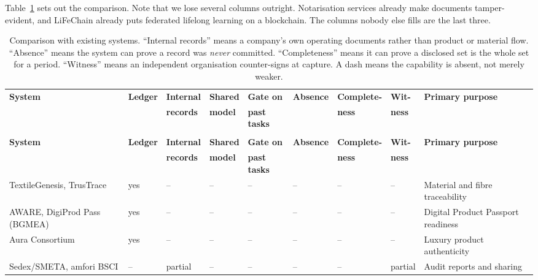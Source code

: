 \documentclass[11pt,a4paper]{article}
\begin{document}
Table~\ref{tab:market} sets out the comparison. Note that we lose several
columns outright. Notarisation services already make documents tamper-evident,
and LiFeChain already puts federated lifelong learning on a blockchain. The
columns nobody else fills are the last three.

\begingroup
\scriptsize
\setlength{\tabcolsep}{2.5pt}
\begin{longtable}{@{}>{\raggedright\arraybackslash}p{2.8cm}
  >{\centering\arraybackslash}p{1.1cm}
  >{\centering\arraybackslash}p{1.25cm}
  >{\centering\arraybackslash}p{1.1cm}
  >{\centering\arraybackslash}p{1.1cm}
  >{\centering\arraybackslash}p{1.25cm}
  >{\centering\arraybackslash}p{1.6cm}
  >{\centering\arraybackslash}p{1.0cm}
  >{\raggedright\arraybackslash}p{3.3cm}@{}}
\caption{Comparison with existing systems. ``Internal records'' means a
company's own operating documents rather than product or material flow.
``Absence'' means the system can prove a record was \emph{never} committed.
``Completeness'' means it can prove a disclosed set is the whole set for a period.
``Witness'' means an independent organisation counter-signs at capture. A dash
means the capability is absent, not merely weaker.}
\label{tab:market}\\
\toprule
\textbf{System} & \textbf{Ledger} & \textbf{Internal} & \textbf{Shared} &
\textbf{Gate on} & \textbf{Absence} & \textbf{Complete-} & \textbf{Wit-} &
\textbf{Primary purpose} \\
 & & \textbf{records} & \textbf{model} & \textbf{past tasks} & & \textbf{ness} & \textbf{ness} & \\
\midrule
\endfirsthead
\multicolumn{9}{@{}l}{\scriptsize\tablename~\thetable{} (continued)}\\
\toprule
\textbf{System} & \textbf{Ledger} & \textbf{Internal} & \textbf{Shared} &
\textbf{Gate on} & \textbf{Absence} & \textbf{Complete-} & \textbf{Wit-} &
\textbf{Primary purpose} \\
 & & \textbf{records} & \textbf{model} & \textbf{past tasks} & & \textbf{ness} & \textbf{ness} & \\
\midrule
\endhead
\bottomrule
\endfoot
TextileGenesis, TrusTrace & yes & -- & -- & -- & -- & -- & -- & Material and fibre traceability \\
AWARE, DigiProd Pass (BGMEA) & yes & -- & -- & -- & -- & -- & -- & Digital Product Passport readiness \\
Aura Consortium & yes & -- & -- & -- & -- & -- & -- & Luxury product authenticity \\
Sedex/SMETA, amfori BSCI & -- & partial & -- & -- & -- & -- & partial & Audit reports and sharing \\

\end{longtable}
\end{document}
